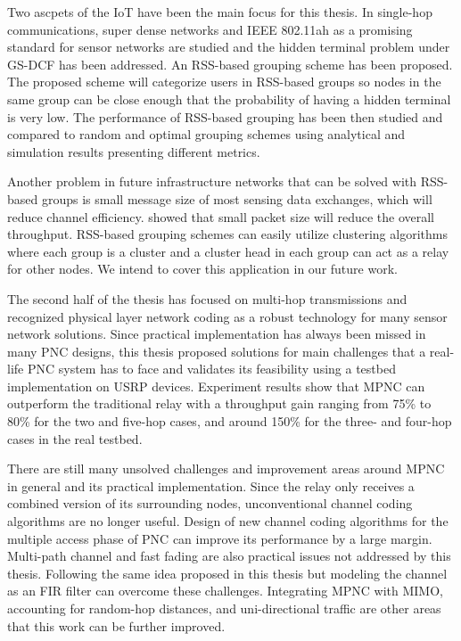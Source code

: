 \label{chapter:concl}

Two ascpets of the IoT have been the main focus for this thesis. In single-hop communications, super dense networks and IEEE 802.11ah as a promising standard for sensor networks are studied and the hidden terminal problem under GS-DCF has been addressed. An RSS-based grouping scheme has been proposed. The proposed scheme will categorize users in RSS-based groups so nodes in the same group can be close enough that the probability of having a hidden terminal is very low.
The performance of RSS-based grouping has been then studied and compared to random and optimal grouping schemes using analytical and simulation results presenting different metrics.

Another problem in future infrastructure networks that can be solved with RSS-based groups is small message size of most sensing data exchanges, which will reduce channel efficiency. \cite{bianchi2000performance} showed that small packet size will reduce the overall throughput. RSS-based grouping schemes can easily utilize clustering algorithms where each group is a cluster and a cluster head in each group can act as a relay for other nodes. We intend to cover this application in our future work.

The second half of the thesis has focused on multi-hop transmissions and recognized physical layer network coding as a robust technology for many sensor network solutions. Since practical implementation has always been missed in many PNC designs, this thesis proposed solutions for main challenges that a real-life PNC system has to face and validates its feasibility using a testbed implementation on USRP devices. Experiment results show that MPNC can outperform the traditional relay with a throughput gain ranging from 75\% to 80\% for the two and five-hop cases, and around 150\% for the three- and four-hop cases in the real testbed.

There are still many unsolved challenges and improvement areas around MPNC in general and its practical implementation. Since the relay only receives a combined version of its surrounding nodes, unconventional channel coding algorithms are no longer useful. Design of new channel coding algorithms for the multiple access phase of PNC can improve its performance by a large margin. Multi-path channel and fast fading are also practical issues not addressed by this thesis. Following the same idea proposed in this thesis but modeling the channel as an FIR filter can overcome these challenges. Integrating MPNC with MIMO, accounting for random-hop distances, and uni-directional traffic are other areas that this work can be further improved.